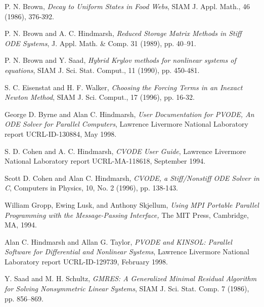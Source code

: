\documentclass[11pt]{article}
\begin{document}
\begin{thebibliography}{9}

P. N. Brown, {\em Decay to Uniform States in Food Webs}, SIAM J. Appl.
Math., 46 (1986), 376-392.

P. N. Brown and A. C. Hindmarsh, {\it Reduced Storage Matrix Methods
in Stiff ODE Systems}, J. Appl. Math. \& Comp. 31 (1989), pp. 40--91.

P. N. Brown and Y. Saad, {\it Hybrid Krylov methods for 
nonlinear systems of equations}, SIAM J. Sci. Stat. Comput., 11 (1990), 
pp. 450-481.

S. C. Eisenstat and H. F. Walker, {\it Choosing the Forcing Terms in an Inexact
Newton Method}, SIAM J. Sci. Comput., 17 (1996),
pp. 16-32.

 George D. Byrne and Alan C. Hindmarsh,
{\it User Documentation for PVODE, An ODE Solver for Parallel Computers}, 
Lawrence Livermore National Laboratory report UCRL-ID-130884, May 1998.

S. D. Cohen and A. C. Hindmarsh, {\it CVODE User Guide},
Lawrence Livermore National Laboratory report UCRL-MA-118618,
September 1994.

  Scott D. Cohen and Alan C. Hindmarsh, {\it CVODE, a
Stiff/Nonstiff ODE Solver in C}, Computers in Physics, 10, No. 2
(1996), pp. 138-143.

  William Gropp, Ewing Lusk, and Anthony Skjellum, {\it Using
MPI Portable Parallel Programming with the Message-Passing Interface, }The
MIT Press, Cambridge, MA, 1994.

Alan C. Hindmarsh and Allan G. Taylor, {\it PVODE and KINSOL: Parallel Software
for Differential and Nonlinear Systems}, Lawrence Livermore National Laboratory
report UCRL-ID-129739, February 1998.

Y. Saad and M. H. Schultz, {\it GMRES: A Generalized Minimal Residual
Algorithm for Solving Nonsymmetric Linear Systems}, SIAM J. Sci. Stat.
Comp. 7 (1986), pp. 856--869.

\end{thebibliography}


\newpage
\end{document}
